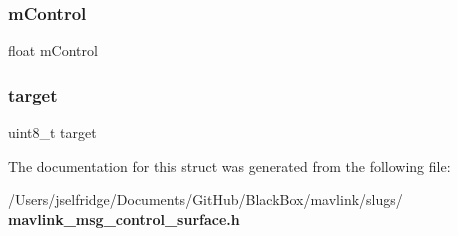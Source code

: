 \mbox{\label{struct____mavlink__control__surface__t_a79bbf83296437698bb5a85404db1230f}} 
\subsubsection{m\+Control}
{\footnotesize\ttfamily float m\+Control}

\mbox{\label{struct____mavlink__control__surface__t_a5f333beb3be5b82c1e091308136aeb7d}} 
\subsubsection{target}
{\footnotesize\ttfamily uint8\+\_\+t target}



The documentation for this struct was generated from the following file\+:\begin{DoxyCompactItemize}
\item 
/\+Users/jselfridge/\+Documents/\+Git\+Hub/\+Black\+Box/mavlink/slugs/\textbf{ mavlink\+\_\+msg\+\_\+control\+\_\+surface.\+h}\end{DoxyCompactItemize}
